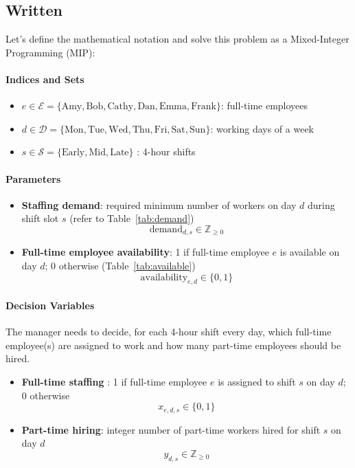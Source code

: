 \documentclass[11pt, letter, answers]{exam}
\begin{document}
\subsection{Written}

Let's define the mathematical notation and solve this problem as a Mixed-Integer Programming (MIP):

\paragraph{Indices and Sets}
\begin{itemize}
    \item $e\in\mathcal{E} = \{\text{Amy}, \text{Bob}, \text{Cathy}, \text{Dan}, \text{Emma}, \text{Frank}\}$: full-time employees
    \item $d\in\mathcal{D} = \{\text{Mon}, \text{Tue},\text{Wed},\text{Thu}, \text{Fri},\text{Sat},\text{Sun}\}$: working days of a week
    \item $s\in\mathcal{S} = \{\text{Early}, \text{Mid}, \text{Late}\}$ : 4-hour shifts
\end{itemize}


\paragraph{Parameters}
\begin{itemize}
    \item \textbf{Staffing demand}: required minimum number of workers on day $d$ during shift slot $s$ (refer to Table~\ref{tab:demand}) {\Large $$\text{demand}_{d,s} \in \mathbb{Z}_{\ge 0}$$}
    \item \textbf{Full-time employee availability}: 1 if full-time employee $e$ is available on day $d$; 0 otherwise (Table~\ref{tab:available}) {\Large $$\text{availability}_{e,d} \in \{0,1\}$$}
\end{itemize}


\paragraph{Decision Variables}
The manager needs to decide, for each 4-hour shift every day, which full-time employee(s) are assigned to work and how many part-time employees should be hired. 
\begin{itemize}
    \large
    \item \textbf{Full-time staffing} : 1 if full-time employee $e$ is assigned to shift $s$ on day $d$; 0 otherwise {\Large $$x_{e,d,s} \in \{0,1\}$$}
    \item \textbf{Part-time hiring}: integer number of part-time workers hired for shift $s$ on day $d$ {\Large $$y_{d,s} \in \mathbb{Z}_{\ge 0}$$}
\end{itemize}
\end{document}
